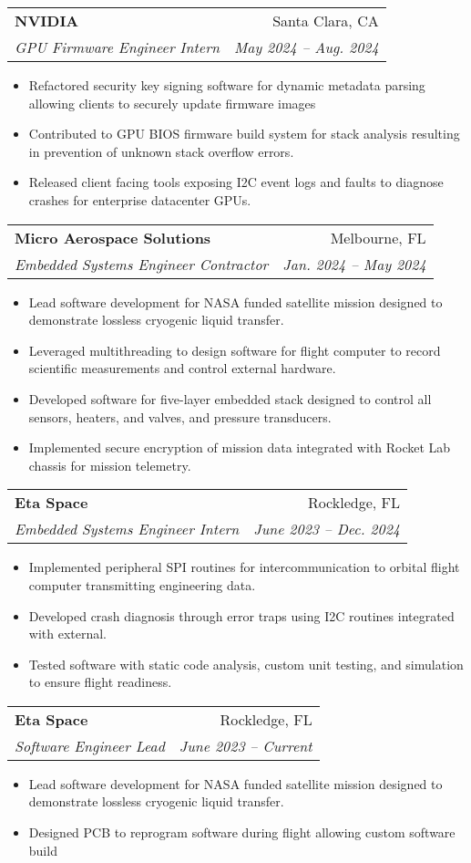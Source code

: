 \documentclass[letterpaper,10pt]{article}
\makeatletter
\newcommand{\resumeSubheading}[4]{
  \item\vspace{1pt}
    \begin{tabular*}{0.97\textwidth}[t]{l@{\extracolsep{\fill}}r}
      \textbf{#1} & #2 \\
      \textit{\small#3} & \textit{\small #4} \\
    \end{tabular*}\vspace{-2pt}
}
\newcommand{\resumeItemListStart}{\begin{itemize}[font=\footnotesize, itemsep=2pt, topsep=2pt]}
\newcommand{\resumeItemListEnd}{\end{itemize}\vspace{-6pt}}
\makeatother
\begin{document}
    \resumeSubheading
      {NVIDIA}{Santa Clara, CA}
      {GPU Firmware Engineer Intern}{May 2024 -- Aug. 2024}
      \resumeItemListStart
        \item{Refactored security key signing software for dynamic metadata parsing allowing clients to securely update firmware images}
        \item{Contributed to GPU BIOS firmware build system for stack analysis resulting in prevention of unknown stack overflow errors.}
        \item{Released client facing tools exposing I2C event logs and faults to diagnose crashes for enterprise datacenter GPUs.}
      \resumeItemListEnd

    \resumeSubheading
      {Micro Aerospace Solutions}{Melbourne, FL}
      {Embedded Systems Engineer Contractor}{Jan. 2024 -- May 2024}
      \resumeItemListStart
        \item{Lead software development for NASA funded satellite mission designed to demonstrate lossless cryogenic liquid transfer.}
        \item{Leveraged multithreading to design software for flight computer to record scientific measurements and control external hardware.}
        \item{Developed software for five-layer embedded stack designed to control all sensors, heaters, and valves, and pressure transducers.}
        \item{Implemented secure encryption of mission data integrated with Rocket Lab chassis for mission telemetry.}
      \resumeItemListEnd

    \resumeSubheading
      {Eta Space}{Rockledge, FL}
      {Embedded Systems Engineer Intern}{June 2023 -- Dec. 2024}
      \resumeItemListStart
        \item{Implemented peripheral SPI routines for intercommunication to orbital flight computer transmitting engineering data.}
        \item{Developed crash diagnosis through error traps using I2C routines integrated with external.}
        \item{Tested software with static code analysis, custom unit testing, and simulation to ensure flight readiness.}
      \resumeItemListEnd

    \resumeSubheading
      {Eta Space}{Rockledge, FL}
      {Software Engineer Lead}{June 2023 -- Current}
      \resumeItemListStart
        \item{Lead software development for NASA funded satellite mission designed to demonstrate lossless cryogenic liquid transfer.}
        \item{Designed PCB to reprogram software during flight allowing custom software build }
      \resumeItemListEnd
\end{document}
